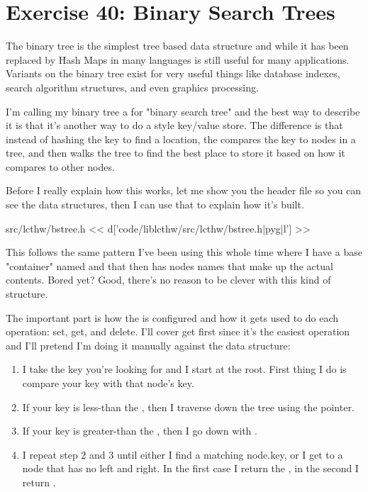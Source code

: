 \chapter{Exercise 40: Binary Search Trees}

The binary tree is the simplest tree based data structure and while it has been
replaced by Hash Maps in many languages is still useful for many applications.
Variants on the binary tree exist for very useful things like database indexes,
search algorithm structures, and even graphics processing.

I'm calling my binary tree a  for "binary search tree" and the best
way to describe it is that it's another way to do a  style key/value
store.  The difference is that instead of hashing the key to find a location,
the  compares the key to nodes in a tree, and then walks the
tree to find the best place to store it based on how it compares to other nodes.

Before I really explain how this works, let me show you the  header
file so you can see the data structures, then I can use that to explain how
it's built.

\begin{code}{src/lcthw/bstree.h}
<< d['code/liblcthw/src/lcthw/bstree.h|pyg|l'] >>
\end{code}

This follows the same pattern I've been using this whole time where I have a 
base "container" named  and that then has nodes names  that make up the actual contents.  Bored yet?  Good, there's no reason to
be clever with this kind of structure.

The important part is how the  is configured and how it gets
used to do each operation: set, get, and delete.  I'll cover get first since
it's the easiest operation and I'll pretend I'm doing it manually against
the data structure:

\begin{enumerate}
\item I take the key you're looking for and I start at the root.  First thing
    I do is compare your key with that node's key.
\item If your key is less-than the , then I traverse down the tree using
    the  pointer.
\item If your key is greater-than the , then I go down with .
\item I repeat step 2 and 3 until either I find a matching node.key, or I get to
    a node that has no left and right.  In the first case I return the , in 
    the second I return .
\end{enumerate}

